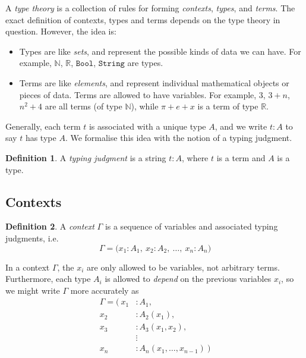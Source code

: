 \documentclass{article}
\theoremstyle{definition}
\newtheorem{definition}{Definition}[section]
\newcommand{\Bool}{\mathtt{Bool}}
\newcommand{\String}{\mathtt{String}}
\newcommand{\N}{\mathbb{N}}		        	    %
\newcommand{\R}{\mathbb{R}}		        	    %
\begin{document}
A \textit{type theory} is a collection of rules for forming \textit{contexts}, \textit{types}, and \textit{terms}. The exact definition of contexts, types and terms depends on the type theory in question. However, the idea is:
\begin{itemize}
    \item Types are like \textit{sets}, and represent the possible kinds of data we can have. For example, $\N$, $\R$, $\Bool$, $\String$ are types.
    
    \item Terms are like \textit{elements}, and represent individual mathematical objects or pieces of data. Terms are allowed to have variables. For example, $3$, $3 + n$, $n^2 + 4$ are all terms (of type $\N$), while $\pi + e + x$ is a term of type $\R$.
\end{itemize}

Generally, each term $t$ is associated with a unique type $A$, and we write $t : A$ to say $t$ has type $A$. We formalise this idea with the notion of a typing judgment.

\begin{definition}
    A \textit{typing judgment} is a string $t : A$, where $t$ is a term and $A$ is a type.
\end{definition}


\subsection{Contexts}

\begin{definition}
    A \textit{context} $\Gamma$ is a sequence of variables and associated typing judgments, i.e.
    $$\Gamma = \big( x_1 : A_1,\ x_2 : A_2,\ \ldots,\ x_n : A_n \big)$$
\end{definition}

In a context $\Gamma$, the $x_i$ are only allowed to be variables, not arbitrary terms. Furthermore, each type $A_i$ is allowed to \textit{depend} on the previous variables $x_i$, so we might write $\Gamma$ more accurately as
\begin{align*}
    \Gamma = \big(\
    x_1 &: A_1,\\
    x_2 &: A_2(x_1),\\
    x_3 &: A_3(x_1,x_2),\\
    &\mathrel{\vdots}\\
    x_n &: A_n(x_1,\ldots,x_{n-1})\ \big)
\end{align*}
\end{document}
